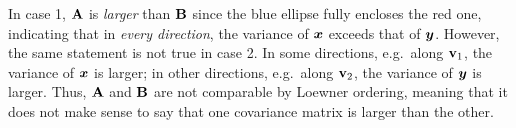 \documentclass[a4paper]{article}
\begin{document}
\begin{multicols}{2}
In case 1, $\AA$ is \emph{larger} than $\BB$
since the blue ellipse fully encloses the red one,
indicating that in \emph{every direction}, the variance of $\xx$ exceeds that of $\yy$.
However, the same statement is not true in case 2.
In some directions, e.g.\ along $\vv_1$, the variance of $\xx$ is larger;
in other directions, e.g.\ along $\vv_2$, the variance of $\yy$ is larger.
Thus, $\AA$ and $\BB$ are not comparable by Loewner ordering,
meaning that it does not make sense to say that one covariance matrix is larger than the other.
\asDemonstrated

\end{multicols}
\end{document}
